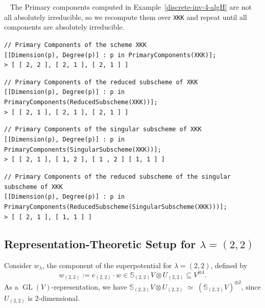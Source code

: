 \documentclass{amsart}
\DeclareMathOperator{\GL}{GL}
\begin{document}
\begin{example}~\label{procedure-check}
The Primary components computed in Example~\ref{discrete-inv-4-algH} are not all absolutely irreducible, so we recompute them over \texttt{XKK} and repeat until all components are absolutely irreducible.

\begin{flushleft}
\texttt{// Primary Components of the scheme XKK } \\
\texttt{[[Dimension(p), Degree(p)] : p in PrimaryComponents(XKK)];}\\
\texttt{> [ [ 2, 2 ], [ 2, 1 ], [ 2, 1 ] ]}
\end{flushleft}


\begin{flushleft}
\texttt{// Primary Components of the reduced subscheme of XKK} \\
\texttt{[[Dimension(p), Degree(p)] : p in PrimaryComponents(ReducedSubscheme(XKK))];}\\
\texttt{> [ [ 2, 1 ], [ 2, 1 ], [ 2, 1 ] ]}
\end{flushleft}


\begin{flushleft}
\texttt{// Primary Components of the singular subscheme of XKK} \\
\texttt{[[Dimension(p), Degree(p)] : p in PrimaryComponents(SingularSubscheme(XKK))];}\\
\texttt{> [ [ 2, 1 ], [ 1, 2 ], [ 1 , 2 ] [ 1, 1 ] ]}
\end{flushleft}


\begin{flushleft}
\texttt{// Primary Components of the reduced subscheme of the singular subscheme of XKK} \\
\texttt{[[Dimension(p), Degree(p)] : p in PrimaryComponents(ReducedSubscheme(SingularSubscheme(XKK)))];}\\
\texttt{> [ [ 2, 1 ], [ 1, 1 ] ]}
\end{flushleft}
\end{example}

\subsection{Representation-Theoretic Setup for \(\lambda = (2,2)\)}
\noindent

Consider \(w_\lambda\), the component of the superpotential for $\lambda = (2,2)$, defined by
\[
w_{(2,2)} := e_{(2,2)} \cdot w \in \mathbb{S}_{(2,2)} V \otimes U_{(2,2)} \subseteq V^{\otimes 4}.
\]
As a \(\GL(V)\)-representation, we have $ \mathbb{S}_{(2,2)} V \otimes U_{(2,2)} \;\simeq\; (\mathbb{S}_{(2,2)} V)^{\oplus 2}$, since  $U_{(2,2)}$ is 2-dimensional. 
\end{document}
